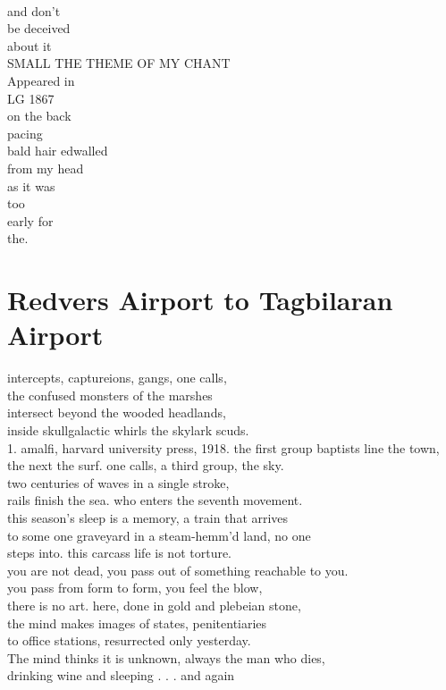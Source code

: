 \documentclass[smalldemyvopaper,11pt,twoside,onecolumn,openright,extrafontsizes]{memoir}
\begin{document}
\\and don't
\\be deceived
\\about it
\\SMALL THE THEME OF MY CHANT
\\Appeared in
\\LG 1867
\\on the back
\\pacing
\\bald hair edwalled
\\from my head
\\as it was
\\too
\\early for
\\the.



\chapter{Redvers Airport to Tagbilaran Airport}
intercepts, captureions, gangs, one calls,
\\the confused monsters of the marshes
\\intersect beyond the wooded headlands,
\\inside skullgalactic whirls the skylark scuds.
\\1.  amalfi, harvard university press, 1918. the first group baptists line the town,
\\the next the surf. one calls, a third group, the sky.
\\two centuries of waves in a single stroke,
\\rails finish the sea. who enters the seventh movement.
\\this season's sleep is a memory, a train that arrives
\\to some one graveyard in a steam-hemm'd land, no one
\\steps into. this carcass life is not torture.
\\you are not dead, you pass out of something reachable to you.
\\you pass from form to form, you feel the blow,
\\there is no art. here, done in gold and plebeian stone,
\\the mind makes images of states, penitentiaries
\\to office stations, resurrected only yesterday.
\\The mind thinks it is unknown, always the man who dies,
\\drinking wine and sleeping . . . and again
\end{document}
